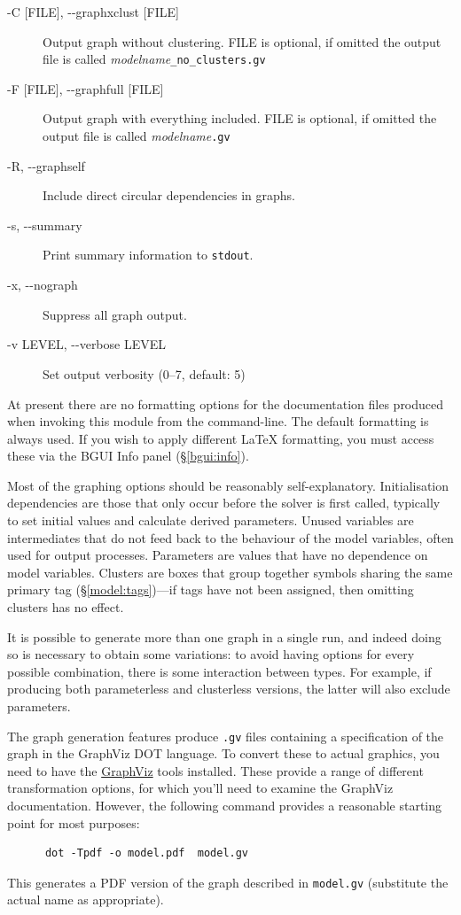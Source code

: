 \documentclass[a4paper,11pt]{article}
\begin{document}
\begin{adjustwidth}{0.8cm}{0.8cm}
\begin{description}
\item[-C {[}FILE{]}, -{}-graphxclust {[}FILE{]}] Output graph without clustering. FILE is optional, if omitted the output file is called \textit{modelname}\texttt{\_no\_clusters.gv}
\item[-F {[}FILE{]}, -{}-graphfull {[}FILE{]}] Output graph with everything included. FILE is optional, if omitted the output file is called \textit{modelname}\texttt{.gv}
\item[-R, -{}-graphself] Include direct circular dependencies in graphs.
\item[-s, -{}-summary] Print summary information to \texttt{stdout}.
\item[-x, -{}-nograph] Suppress all graph output.
\item[-v LEVEL, -{}-verbose LEVEL] Set output verbosity (0--7, default: 5)
\end{description}
\end{adjustwidth}

At present there are no formatting options for the documentation files produced when invoking this module from the command-line. The default formatting is always used. If you wish to apply different \LaTeX{} formatting, you must access these via the BGUI Info panel (\S\ref{bgui:info}).

Most of the graphing options should be reasonably self-explanatory. Initialisation dependencies are those that only occur before the solver is first called, typically to set initial values and calculate derived parameters. Unused variables are intermediates that do not feed back to the behaviour of the model variables, often used for output processes. Parameters are values that have no dependence on model variables. Clusters are boxes that group together symbols sharing the same primary tag (\S\ref{model:tags})---if tags have not been assigned, then omitting clusters has no effect.

It is possible to generate more than one graph in a single run, and indeed doing so is necessary to obtain some variations: to avoid having options for every possible combination, there is some interaction between types. For example, if producing both parameterless and clusterless versions, the latter will also exclude parameters.

The graph generation features produce \texttt{.gv} files containing a specification of the graph in the GraphViz DOT language. To convert these to actual graphics, you need to have the \href{http://www.graphviz.org}{GraphViz} tools installed. These provide a range of different transformation options, for which you'll need to examine the GraphViz documentation. However, the following command provides a reasonable starting point for most purposes:
\begin{verbatim}
      dot -Tpdf -o model.pdf  model.gv
\end{verbatim}
This generates a PDF version of the graph described in \texttt{model.gv} (substitute the actual name as appropriate).
\end{document}

